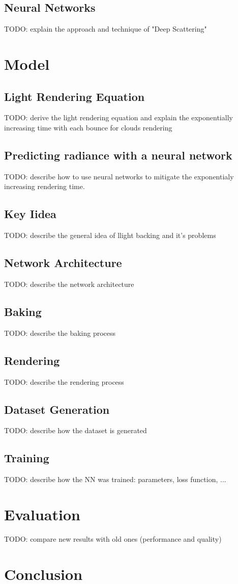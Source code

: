 \documentclass[times,specification,annotation]{itmo-student-thesis}
\begin{document}
\section{Neural Networks}\label{sec:NeuralNetworks}
TODO: explain the approach and technique of "Deep Scattering"
\finishrelatedwork

\chapter{Model}
\section{Light Rendering Equation}\label{sec:LightRenderingEquation}
TODO: derive the light rendering equation and explain the exponentially increasing time with each bounce for clouds rendering
\section{Predicting radiance with a neural network}\label{sec:PredictingRadianceWithNN}
TODO: describe how to use neural networks to mitigate the exponentialy increasing rendering time.

\section{Key Iidea}\label{sec:keyIdea}
TODO: describe the general idea of llight backing and it's problems
\section{Network Architecture}\label{sec:architecture}
TODO: describe the network architecture
\section{Baking}\label{sec:baking}
TODO: describe the baking process
\section{Rendering}\label{sec:rendering}
TODO: describe the rendering process
\section{Dataset Generation}\label{sec:generation}
TODO: describe how the dataset is generated
\section{Training}\label{sec:training}
TODO: describe how the NN was trained: parameters, loss function, ...

\chapter{Evaluation}
TODO: compare new results with old ones (performance and quality)
\chapter{Conclusion}
\end{document}
